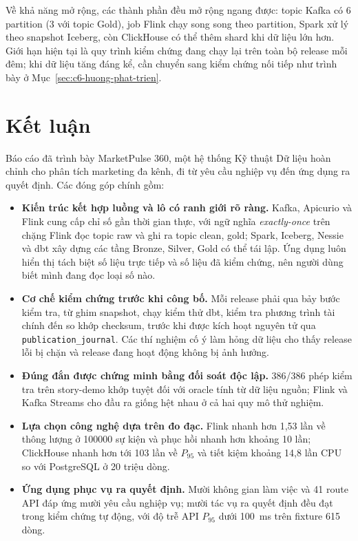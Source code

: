 Về khả năng mở rộng, các thành phần đều mở rộng ngang được: topic Kafka có 6 partition (3 với topic Gold), job Flink chạy song song theo partition, Spark xử lý theo snapshot Iceberg, còn ClickHouse có thể thêm shard khi dữ liệu lớn hơn. Giới hạn hiện tại là quy trình kiểm chứng đang chạy lại trên toàn bộ release mỗi đêm; khi dữ liệu tăng đáng kể, cần chuyển sang kiểm chứng nối tiếp như trình bày ở Mục~\ref{sec:c6-huong-phat-trien}.

\section{Kết luận}
\label{sec:c6-ket-luan}
Báo cáo đã trình bày MarketPulse 360, một hệ thống Kỹ thuật Dữ liệu hoàn chỉnh cho phân tích marketing đa kênh, đi từ yêu cầu nghiệp vụ đến ứng dụng ra quyết định. Các đóng góp chính gồm:

\begin{itemize}
    \item \textbf{Kiến trúc kết hợp luồng và lô có ranh giới rõ ràng.} Kafka, Apicurio và Flink cung cấp chỉ số gần thời gian thực, với ngữ nghĩa \emph{exactly-once} trên chặng Flink đọc topic raw và ghi ra topic clean, gold; Spark, Iceberg, Nessie và dbt xây dựng các tầng Bronze, Silver, Gold có thể tái lập. Ứng dụng luôn hiển thị tách biệt số liệu trực tiếp và số liệu đã kiểm chứng, nên người dùng biết mình đang đọc loại số nào.
    \item \textbf{Cơ chế kiểm chứng trước khi công bố.} Mỗi release phải qua bảy bước kiểm tra, từ ghim snapshot, chạy kiểm thử dbt, kiểm tra phương trình tài chính đến so khớp checksum, trước khi được kích hoạt nguyên tử qua \texttt{publication\_journal}. Các thí nghiệm cố ý làm hỏng dữ liệu cho thấy release lỗi bị chặn và release đang hoạt động không bị ảnh hưởng.
    \item \textbf{Đúng đắn được chứng minh bằng đối soát độc lập.} 386/386 phép kiểm tra trên story-demo khớp tuyệt đối với oracle tính từ dữ liệu nguồn; Flink và Kafka Streams cho đầu ra giống hệt nhau ở cả hai quy mô thử nghiệm.
    \item \textbf{Lựa chọn công nghệ dựa trên đo đạc.} Flink nhanh hơn 1,53 lần về thông lượng ở \num{100000} sự kiện và phục hồi nhanh hơn khoảng 10 lần; ClickHouse nhanh hơn tới 103 lần về $P_{95}$ và tiết kiệm khoảng 14,8 lần CPU so với PostgreSQL ở 20 triệu dòng.
    \item \textbf{Ứng dụng phục vụ ra quyết định.} Mười không gian làm việc và 41 route API đáp ứng mười yêu cầu nghiệp vụ; mười tác vụ ra quyết định đều đạt trong kiểm chứng tự động, với độ trễ API $P_{95}$ dưới 100~ms trên fixture 615 dòng.
\end{itemize}

